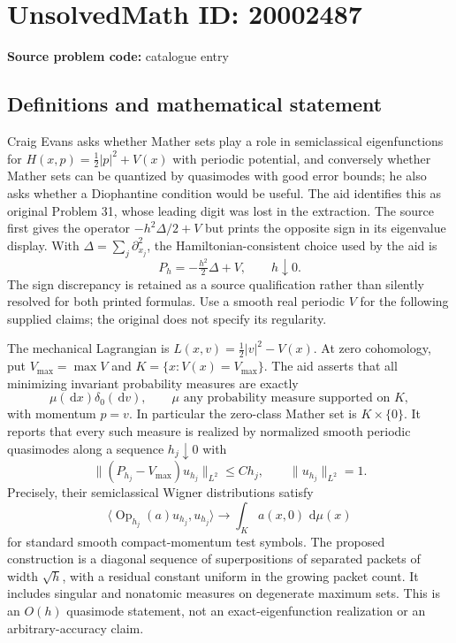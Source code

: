 \documentclass[11pt]{article}
\newcommand{\dd}{\,\mathrm{d}}
\begin{document}
\section*{UnsolvedMath ID: 20002487}
\textbf{Source problem code:} catalogue entry
\subsection{Definitions and mathematical statement}
Craig Evans asks whether Mather sets play a role in semiclassical eigenfunctions for $H(x,p)=\tfrac12|p|^2+V(x)$ with periodic potential, and conversely whether Mather sets can be quantized by quasimodes with good error bounds; he also asks whether a Diophantine condition would be useful. The aid identifies this as original Problem 31, whose leading digit was lost in the extraction. The source first gives the operator $-h^2\Delta/2+V$ but prints the opposite sign in its eigenvalue display. With $\Delta=\sum_j\partial_{x_j}^2$, the Hamiltonian-consistent choice used by the aid is
\[
P_h=-\tfrac{h^2}{2}\Delta+V,\qquad h\downarrow0.
\]
The sign discrepancy is retained as a source qualification rather than silently resolved for both printed formulas. Use a smooth real periodic $V$ for the following supplied claims; the original does not specify its regularity.

The mechanical Lagrangian is $L(x,v)=\tfrac12|v|^2-V(x)$. At zero cohomology, put $V_{\max}=\max V$ and $K=\{x:V(x)=V_{\max}\}$. The aid asserts that all minimizing invariant probability measures are exactly
\[
\mu(\dd x)\delta_0(\dd v),\qquad \mu\text{ any probability measure supported on }K,
\]
with momentum $p=v$. In particular the zero-class Mather set is $K\times\{0\}$. It reports that every such measure is realized by normalized smooth periodic quasimodes along a sequence $h_j\downarrow0$ with
\[
\|(P_{h_j}-V_{\max})u_{h_j}\|_{L^2}\leq C h_j,\qquad
\|u_{h_j}\|_{L^2}=1.
\]
Precisely, their semiclassical Wigner distributions satisfy
\[
\langle\operatorname{Op}_{h_j}(a)u_{h_j},u_{h_j}\rangle
\longrightarrow\int_K a(x,0)\,\dd\mu(x)
\]
for standard smooth compact-momentum test symbols. The proposed construction is a diagonal sequence of superpositions of separated packets of width $\sqrt h$, with a residual constant uniform in the growing packet count. It includes singular and nonatomic measures on degenerate maximum sets. This is an $O(h)$ quasimode statement, not an exact-eigenfunction realization or an arbitrary-accuracy claim.
\end{document}
